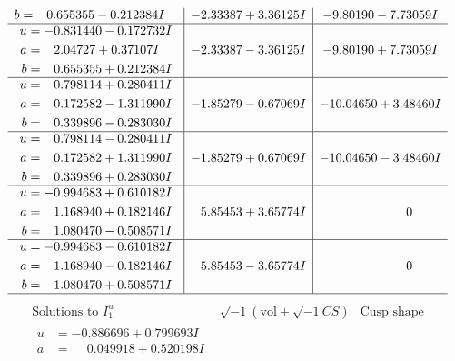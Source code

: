 \documentclass[1p]{elsarticle_modified}
\theoremstyle{definition}
\newcommand{\I}{\sqrt{-1}}
\begin{document}
$$\begin{array}{c|c|c}
\begin{aligned}
b &= \phantom{-}0.655355 - 0.212384 I\end{aligned}
 & -2.33387 + 3.36125 I & -9.80190 - 7.73059 I \\ \hline\begin{aligned}
u &= -0.831440 - 0.172732 I \\
a &= \phantom{-}2.04727 + 0.37107 I \\
b &= \phantom{-}0.655355 + 0.212384 I\end{aligned}
 & -2.33387 - 3.36125 I & -9.80190 + 7.73059 I \\ \hline\begin{aligned}
u &= \phantom{-}0.798114 + 0.280411 I \\
a &= \phantom{-}0.172582 - 1.311990 I \\
b &= \phantom{-}0.339896 - 0.283030 I\end{aligned}
 & -1.85279 - 0.67069 I & -10.04650 + 3.48460 I \\ \hline\begin{aligned}
u &= \phantom{-}0.798114 - 0.280411 I \\
a &= \phantom{-}0.172582 + 1.311990 I \\
b &= \phantom{-}0.339896 + 0.283030 I\end{aligned}
 & -1.85279 + 0.67069 I & -10.04650 - 3.48460 I \\ \hline\begin{aligned}
u &= -0.994683 + 0.610182 I \\
a &= \phantom{-}1.168940 + 0.182146 I \\
b &= \phantom{-}1.080470 - 0.508571 I\end{aligned}
 & \phantom{-}5.85453 + 3.65774 I & \phantom{-0.000000 } 0 \\ \hline\begin{aligned}
u &= -0.994683 - 0.610182 I \\
a &= \phantom{-}1.168940 - 0.182146 I \\
b &= \phantom{-}1.080470 + 0.508571 I\end{aligned}
 & \phantom{-}5.85453 - 3.65774 I & \phantom{-0.000000 } 0\\
 \hline 
 \end{array}$$\newpage$$\begin{array}{c|c|c}  
\text{Solutions to }I^u_{1}& \I (\text{vol} + \sqrt{-1}CS) & \text{Cusp shape}\\
 \hline 
\begin{aligned}
u &= -0.886696 + 0.799693 I \\
a &= \phantom{-}0.049918 + 0.520198 I \\

\end{aligned}
\end{array}$$
\end{document}
